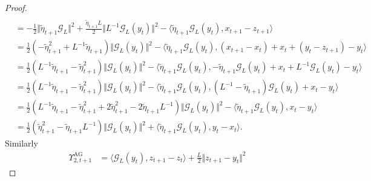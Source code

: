 \documentclass[12pt]{article}
\begin{document}
\begin{proof}
\begin{align*}
            \\
            &= 
            - \frac{1}{2}\Vert \tilde\eta_{t + 1} \mathcal G_L\Vert^2 + 
            \frac{\tilde\eta_{t + 1}L}{2}\Vert L^{-1} \mathcal G_L(y_t)\Vert^2
            - 
            \langle \tilde\eta_{t + 1} \mathcal G_L(y_t), x_{t + 1} - z_{t + 1} \rangle
            \\
            &= 
            \frac{1}{2}\left(
                - \tilde\eta_{t + 1}^2 + 
                L^{-1}\tilde\eta_{t + 1}
            \right)\Vert \mathcal G_L(y_t)\Vert^2
            - 
            \langle 
                \tilde\eta_{t + 1} \mathcal G_L(y_t), 
                (x_{t + 1} - x_{t}) + x_t
                + (y_t - z_{t + 1}) - y_t
            \rangle
            \\
            &= 
            \frac{1}{2}\left(
                L^{-1}\tilde\eta_{t + 1}
                - \tilde\eta_{t + 1}^2
            \right)\Vert \mathcal G_L(y_t)\Vert^2
            - 
            \langle 
                \tilde\eta_{t + 1} \mathcal G_L(y_t), 
                -\tilde\eta_{t + 1}\mathcal G_L(y_t) + x_t 
                + L^{-1}\mathcal G_L(y_t) - y_t
            \rangle
            \\
            &= 
            \frac{1}{2}\left(
                L^{-1}\tilde\eta_{t + 1}
                - \tilde\eta_{t + 1}^2
            \right)\Vert \mathcal G_L(y_t)\Vert^2
            - \langle 
                \tilde\eta_{t +1}\mathcal G_L(y_t), 
                (L^{-1} - \tilde\eta_{t + 1})\mathcal G_L(y_t) + x_t - y_t
            \rangle
            \\
            &= \frac{1}{2}\left(
                L^{-1}\tilde\eta_{t + 1} - \tilde\eta_{t + 1}^2 
                + 2 \tilde\eta_{t + 1}^2 - 2\tilde\eta_{t + 1}L^{-1}
            \right)\Vert \mathcal G_L(y_t)\Vert^2
            - 
            \langle 
                \tilde\eta_{t + 1} \mathcal G_L(y_t), 
                x_t - y_t
            \rangle
            \\
            &= 
            \frac{1}{2}\left(
                \tilde\eta_{t + 1}^2 - \tilde\eta_{t + 1}L^{-1}
            \right)\Vert \mathcal G_L(y_t)\Vert^2 
            + \langle \tilde\eta_{t + 1} \mathcal G_L(y_t), y_t - x_t\rangle.
        \end{align*}
        Similarly 
        \begin{align*}
            \Upsilon_{2, t + 1}^{\text{AG}} 
            &= 
            \langle \mathcal G_L(y_t), z_{t + 1} - z_t\rangle + 
            \frac{L}{2}\Vert z_{t + 1} - y_t\Vert^2

\end{align*}
\end{proof}
\end{document}
